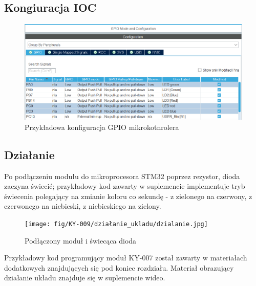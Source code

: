 \documentclass[11pt, a4paper]{article}
\begin{document}
\newpage

\subsection*{Kongiuracja IOC}

\vspace{0.5cm}
\begin{figure}[h!]
    \centering
    \includegraphics[width=16cm]{fig/KY-009/polaczenie_modulu/gpio1.png}
    \caption{Przykładowa konfiguracja GPIO mikrokotnrolera}
    \label{fig:my_label}
\end{figure}

\vspace{1cm}

\subsection*{Działanie}
Po podłączeniu modułu do mikroprocesora STM32 poprzez rezystor, dioda zaczyna świecić; przykładowy kod zawarty w suplemencie implementuje tryb świecenia polegający na zmianie koloru co sekundę - z zielonego na czerwony, z czerwonego na niebieski, z niebieskiego na zielony. 

\begin{figure}[h!]
    \centering
    \texttt{[image: fig/KY-009/działanie\_ukladu/dzialanie.jpg]}
    \caption{Podłączony moduł i świecąca dioda}
    \label{fig:my_label}
\end{figure}

\newpage
Przykładowy kod programujący moduł KY-007 został zawarty w materiałach dodatkowych znajdujących się pod koniec rozdziału. Materiał obrazujący działanie układu znajduje się w suplemencie wideo.

\printbibliography[heading=bibintoc]
\end{document}
